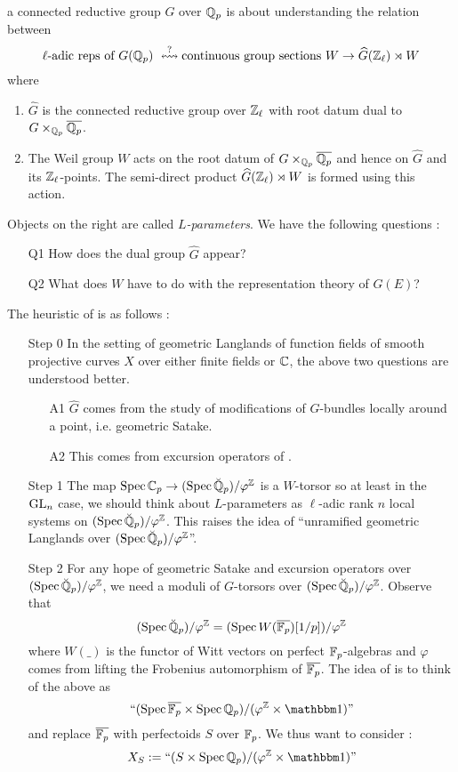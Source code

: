 \documentclass{article}
\begin{document}
a connected reductive group $G$ over $\mathbb{Q}_p$ 
is about understanding the relation between \[
  \text{$\ell$-adic reps of $G(\mathbb{Q}_p)$ }
  \overset{?}{\leftrightsquigarrow}
  \text{continuous group sections $W \to \widehat{G}(\mathbb{Z}_\ell) \rtimes W$}
\]
where \begin{enumerate}
  \item $\widehat{G}$ is the connected reductive group over $\mathbb{Z}_\ell$
  with root datum dual to $G \times_{\mathbb{Q}_p} \overline{\mathbb{Q}_p}$.
  \item The Weil group $W$ acts on the root datum of 
  $G \times_{\mathbb{Q}_p} \overline{\mathbb{Q}_p}$
  and hence on $\widehat{G}$ and its $\mathbb{Z}_\ell$-points.
  The semi-direct product $\widehat{G}(\mathbb{Z}_\ell) \rtimes W$
  is formed using this action.
\end{enumerate}
Objects on the right are called \emph{$L$-parameters}.
\cite[Def. VIII.1.1.]{FS24}
We have the following questions : 
\begin{enumerate}
  \item [Q1] How does the dual group $\widehat{G}$ appear?
  \item [Q2] What does $W$ have to do with the representation theory of $G(E)$?
\end{enumerate}
The heuristic of \cite{FS24} is as follows : 
\begin{enumerate}
  \item [Step 0] In the setting of 
  geometric Langlands of function fields
  of smooth projective curves $X$ over either finite fields or $\mathbb{C}$,
  the above two questions are understood better.
  \begin{enumerate}
    \item [A1] $\widehat{G}$ comes from the study of 
    modifications of $G$-bundles locally around a point,
    i.e. geometric Satake.
    \item [A2] This comes from excursion operators of \cite{Laf18}.
  \end{enumerate}
  \item [Step 1] 
  The map $\operatorname{Spec} \mathbb{C}_p \to (\operatorname{Spec} \breve{\mathbb{Q}}_p) / \varphi^{\mathbb{Z}}$
  is a $W$-torsor so at least in the $\operatorname{GL}_n$ case,
  we should think about $L$-parameters as $\ell$-adic
  rank $n$ local systems on $(\operatorname{Spec} \breve{\mathbb{Q}}_p) / \varphi^{\mathbb{Z}}$.
  This raises the idea of ``unramified geometric Langlands
  over $(\operatorname{Spec} \breve{\mathbb{Q}}_p) / \varphi^{\mathbb{Z}}$''.
  
  \item [Step 2]
  For any hope of geometric Satake and excursion operators 
  over $(\operatorname{Spec} \breve{\mathbb{Q}}_p) / \varphi^{\mathbb{Z}}$,
  we need a moduli of $G$-torsors over 
  $(\operatorname{Spec} \breve{\mathbb{Q}}_p) / \varphi^{\mathbb{Z}}$.
  Observe that \[
    (\operatorname{Spec} \breve{\mathbb{Q}}_p) / \varphi^{\mathbb{Z}} = 
    (\operatorname{Spec} W(\overline{\mathbb{F}_p})[1 / p]) / \varphi^{\mathbb{Z}}
  \]
  where $W(\_)$ is the functor of Witt vectors on perfect $\mathbb{F}_p$-algebras 
  and $\varphi$ comes from lifting the Frobenius
  automorphism of $\overline{\mathbb{F}_p}$.
  The idea of \cite{FS24} is to 
  think of the above as 
  \[
    \text{``$(\SPEC \overline{\bF_p} \times \SPEC \bQ_p )
    / (\varphi^\bZ \times \id)$''}
  \]
  and replace $\overline{\mathbb{F}_p}$ with perfectoids $S$ over $\mathbb{F}_p$.
  We thus want to consider : 
  \[
    X_S := \text{``$(S \times \SPEC \bQ_p)
    / (\varphi^\bZ \times \id)$''}
  \]
\end{enumerate}
\end{document}
